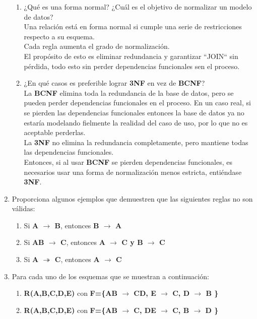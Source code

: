 \documentclass{article}
\begin{document}
\begin{enumerate}
\begin{enumerate}[label = \alph*.]
        \item ¿Qué es una forma normal? ¿Cuál es el objetivo de normalizar un modelo de datos? \\
        Una relación está en forma normal si cumple una serie
        de restricciones respecto a su esquema.\\
        Cada regla aumenta el grado de normalización.\\
        El propósito de esto es eliminar redundancia y 
        garantizar ``JOIN`` sin pérdida, todo esto sin perder
        dependencias funcionales sen el proceso.
        \item ¿En qué casos es preferible lograr \textbf{3NF} en vez de \textbf{BCNF}?\\
        La \textbf{BCNF} elimina toda la redundancia de la base
        de datos, pero se pueden perder dependencias funcionales
        en el proceso. En un caso real, si se pierden las
        dependencias funcionales entonces la base de datos ya no
        estaría modelando fielmente la realidad del caso de uso,
        por lo que no es aceptable perderlas.\\
        La \textbf{3NF} no elimina la redundancia completamente,
        pero mantiene todas las dependencias funcionales.\\
        Entonces, si al usar \textbf{BCNF} se pierden
        dependencias funcionales, es necesarios usar una forma
        de normalización menos estricta, entiéndase 
        \textbf{3NF}.
    \end{enumerate}

    \item
    Proporciona algunos ejemplos que demuestren que las siguientes reglas no son válidas:
    \begin{enumerate}
    	\item Si \textbf{A $\rightarrow$ B}, entonces  \textbf{B $\rightarrow$ A}
    	\item Si \textbf{AB $\rightarrow$ C}, entonces  \textbf{A $\rightarrow$ C y B $\rightarrow$ C}
    	\item Si \textbf{A $\twoheadrightarrow$ C}, entonces \textbf{A $\rightarrow$ C}
    \end{enumerate}
       
    \item Para cada uno de los esquemas que se muestran a continuación:
    
    \begin{enumerate}
    	\item \textbf{R(A,B,C,D,E)} con \textbf{F=\{AB $\rightarrow$ CD, E $\rightarrow$ C, D $\rightarrow$ B \}}
    	\item \textbf{R(A,B,C,D,E)}  con \textbf{F=\{AB $\rightarrow$ C, DE $\rightarrow$ C, B $\rightarrow$ D \}}
    \end{enumerate}   


\end{enumerate}
\end{document}

